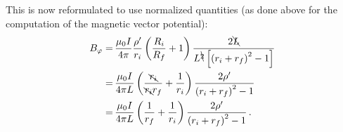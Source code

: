 This is now reformulated to use normalized quantities
(as done above for the computation of the magnetic vector potential):
\begin{align}
 B_\varphi
 =&\, \frac{\mu_0 I}{4 \pi}
      \frac{\rho'}{r_i}
      \left(\frac{R_i}{R_f} + 1 \right)
      \frac{2 \bcancel{L}}{L^{\bcancel{2}} \left[ \left(r_i + r_f\right)^2 - 1\right]} \nonumber \\
 =&\, \frac{\mu_0 I}{4 \pi L}
      \left(\frac{\bcancel{r_i}}{\bcancel{r_i} r_f} + \frac{1}{r_i} \right)
      \frac{2 \rho'}{\left(r_i + r_f\right)^2 - 1} \nonumber \\
 =&\, \frac{\mu_0 I}{4 \pi L}
      \left(\frac{1}{r_f} + \frac{1}{r_i} \right)
      \frac{2 \rho'}{\left(r_i + r_f\right)^2 - 1} \, .
\end{align}
